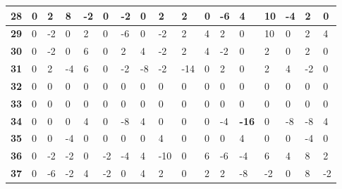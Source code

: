 \begin{longtable}[c]{|l|l|l|l|l|l|l|l|l|l|l|l|l|l|l|l|l|}
\textbf{28} & 0          & 2          & 8          & -2         & 0          & -2         & 0          & 2          & 2          & 0          & -6          & 4            & 10          & -4          & 2           & 0            \\ \hline
\textbf{29} & 0          & -2         & 0          & 2          & 0          & -6         & 0          & -2         & 2          & 4          & 2           & 0            & 10          & 0           & 2           & 4            \\ \hline
\textbf{30} & 0          & -2         & 0          & 6          & 0          & 2          & 4          & -2         & 2          & 4          & -2          & 0            & 2           & 0           & 2           & 0            \\ \hline
\textbf{31} & 0          & 2          & -4         & 6          & 0          & -2         & -8         & -2         & -14        & 0          & 2           & 0            & 2           & 4           & -2          & 0            \\ \hline
\textbf{32} & 0          & 0          & 0          & 0          & 0          & 0          & 0          & 0          & 0          & 0          & 0           & 0            & 0           & 0           & 0           & 0            \\ \hline
\textbf{33} & 0          & 0          & 0          & 0          & 0          & 0          & 0          & 0          & 0          & 0          & 0           & 0            & 0           & 0           & 0           & 0            \\ \hline
\textbf{34} & 0          & 0          & 0          & 4          & 0          & -8         & 4          & 0          & 0          & 0          & -4          & \textbf{-16} & 0           & -8          & -8          & 4            \\ \hline
\textbf{35} & 0          & 0          & -4         & 0          & 0          & 0          & 0          & 4          & 0          & 0          & 0           & 4            & 0           & 0           & -4          & 0            \\ \hline
\textbf{36} & 0          & -2         & -2         & 0          & -2         & -4         & 4          & -10        & 0          & 6          & -6          & -4           & 6           & 4           & 8           & 2            \\ \hline
\textbf{37} & 0          & -6         & -2         & 4          & -2         & 0          & 4          & 2          & 0          & 2          & 2           & -8           & -2          & 0           & 8           & -2           \\ \hline

\end{longtable}
